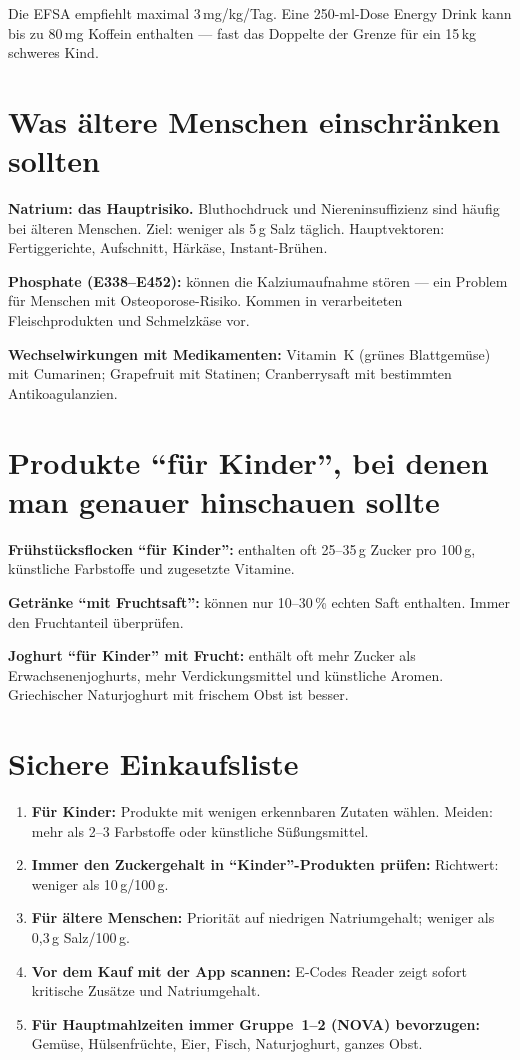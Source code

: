 \documentclass[a5paper,12pt,oneside,openany]{book}
\newcommand{\boxrot}[2]{%
  \begin{tcolorbox}[kastenbase,
    colback=rot!8!white, colframe=rot, title={#1}]
  #2\end{tcolorbox}}
\begin{document}
\boxrot{Koffein}{Die EFSA empfiehlt maximal 3\,mg/kg/Tag. Eine 250-ml-Dose
Energy Drink kann bis zu 80\,mg Koffein enthalten --- fast das Doppelte der
Grenze f\"{u}r ein 15\,kg schweres Kind.}

\section{Was \"{a}ltere Menschen einschr\"{a}nken sollten}

\textbf{Natrium: das Hauptrisiko.} Bluthochdruck und Niereninsuffizienz sind
h\"{a}ufig bei \"{a}lteren Menschen. Ziel: weniger als 5\,g Salz t\"{a}glich.
Hauptvektoren: Fertiggerichte, Aufschnitt, H\"{a}rk\"{a}se, Instant-Br\"{u}hen.

\textbf{Phosphate (E338--E452):} k\"{o}nnen die Kalziumaufnahme st\"{o}ren ---
ein Problem f\"{u}r Menschen mit Osteoporose-Risiko. Kommen in verarbeiteten
Fleischprodukten und Schmelzk\"{a}se vor.

\textbf{Wechselwirkungen mit Medikamenten:} Vitamin~K (gr\"{u}nes Blattgem\"{u}se)
mit Cumarinen; Grapefruit mit Statinen; Cranberrysaft mit bestimmten
Antikoagulanzien.

\section{Produkte ``f\"{u}r Kinder'', bei denen man genauer hinschauen sollte}

\textbf{Fr\"{u}hst\"{u}cksflocken ``f\"{u}r Kinder'':} enthalten oft 25--35\,g
Zucker pro 100\,g, k\"{u}nstliche Farbstoffe und zugesetzte Vitamine.

\textbf{Getr\"{a}nke ``mit Fruchtsaft'':} k\"{o}nnen nur 10--30\,\% echten
Saft enthalten. Immer den Fruchtanteil \"{u}berpr\"{u}fen.

\textbf{Joghurt ``f\"{u}r Kinder'' mit Frucht:} enth\"{a}lt oft mehr Zucker
als Erwachsenenjoghurts, mehr Verdickungsmittel und k\"{u}nstliche Aromen.
Griechischer Naturjoghurt mit frischem Obst ist besser.

\section{Sichere Einkaufsliste}

\begin{enumerate}
  \item \textbf{F\"{u}r Kinder:} Produkte mit wenigen erkennbaren Zutaten
    w\"{a}hlen. Meiden: mehr als 2--3 Farbstoffe oder k\"{u}nstliche
    S\"{u}{\ss}ungsmittel.
  \item \textbf{Immer den Zuckergehalt in ``Kinder''-Produkten pr\"{u}fen:}
    Richtwert: weniger als 10\,g/100\,g.
  \item \textbf{F\"{u}r \"{a}ltere Menschen:} Priorit\"{a}t auf niedrigen
    Natriumgehalt; weniger als 0,3\,g Salz/100\,g.
  \item \textbf{Vor dem Kauf mit der App scannen:}
    E-Codes Reader zeigt sofort kritische Zus\"{a}tze und Natriumgehalt.
  \item \textbf{F\"{u}r Hauptmahlzeiten immer Gruppe~1--2 (NOVA) bevorzugen:}
    Gem\"{u}se, H\"{u}lsenfr\"{u}chte, Eier, Fisch, Naturjoghurt, ganzes Obst.
\end{enumerate}
\end{document}
